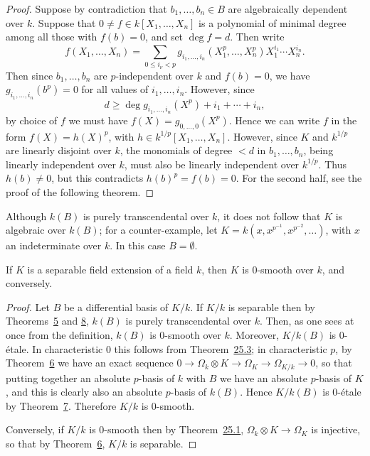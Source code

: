 \begin{proof}
Suppose by contradiction that $b_1, \ldots, b_n \in B$ are algebraically dependent
over $k$. Suppose that $0 \ne f \in k[X_1, \ldots, X_n]$ is a polynomial of minimal degree
among all those with $f(b) = 0$, and set $\deg f = d$. Then write
\[
  f(X_1, \ldots, X_n) = \sum_{0 \le i_\nu < p} g_{i_1, \ldots, i_n}(X_1^p, \ldots, X_n^p)
      X_1^{i_1} \cdots X_n^{i_n}.
\]
Then since $b_1, \ldots, b_n$ are $p$-independent over $k$ and $f(b) = 0$, we have
$g_{i_1, \ldots, i_n}(b^p) = 0$ for all values of $i_1, \ldots, i_n$. However, since
\[
  d \ge \deg g_{i_1, \ldots, i_n}(X^p) + i_1 + \cdots + i_n,
\]
by choice of $f$ we must have $f(X) = g_{0, \ldots, 0}(X^p)$. Hence we can write $f$ in the
form $f(X) = h(X)^p$, with $h \in k^{1/p}[X_1, \ldots, X_n]$. However, since $K$ and $k^{1/p}$
are linearly disjoint over $k$, the monomials of degree $< d$ in $b_1, \ldots, b_n$, being
linearly independent over $k$, must also be linearly independent over $k^{1/p}$.
Thus $h(b) \ne 0$, but this contradicts $h(b)^p = f(b) = 0$. For the second half, see
the proof of the following theorem.
\end{proof}

\begin{remark}
Although $k(B)$ is purely transcendental over $k$, it does not follow that $K$ is
algebraic over $k(B)$; for a counter-example, let $K = k(x, x^{p^{-1}}, x^{p^{-2}}, \ldots)$,
with $x$ an indeterminate over $k$. In this case $B = \emptyset$.
\end{remark}

\begin{theorem}\label{thm:26.9}
If $K$ is a separable field extension of a field $k$, then $K$ is 0-smooth over $k$,
and conversely.
\end{theorem}

\begin{proof}
Let $B$ be a differential basis of $K/k$. If $K/k$ is separable then by
Theorems~\hyperref[thm:26.5]{5} and \hyperref[thm:26.8]{8}, $k(B)$ is purely transcendental over $k$. Then, as
one sees at once from the definition, $k(B)$ is 0-smooth over $k$. Moreover,
$K/k(B)$ is 0-\'etale. In characteristic $0$ this follows from
Theorem~\hyperref[thm:25.3]{25.3}; in characteristic $p$, by
Theorem~\hyperref[thm:26.6]{6} we have an exact sequence
$0 \to \Omega_k \otimes K \to \Omega_K \to \Omega_{K/k} \to 0$, so that putting together an absolute
$p$-basis of $k$ with $B$ we have an absolute $p$-basis of $K$, and this is clearly
also an absolute $p$-basis of $k(B)$. Hence $K/k(B)$ is 0-\'etale by
Theorem~\hyperref[thm:26.7]{7}. Therefore $K/k$ is 0-smooth.

Conversely, if $K/k$ is 0-smooth then by Theorem~\hyperref[thm:25.1]{25.1}, $\Omega_k \otimes K \to \Omega_K$
is injective, so that by Theorem~\hyperref[thm:26.6]{6}, $K/k$ is separable.
\end{proof}

